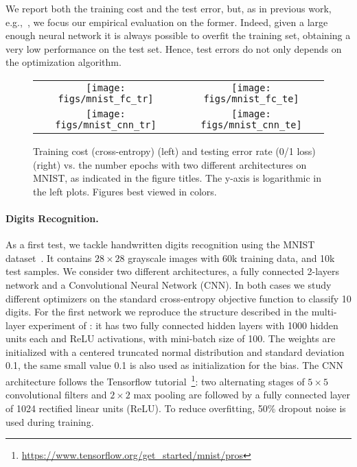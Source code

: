 \documentclass{article}
\begin{document}
We report both the training cost and the test error, but, as in previous work, e.g.,~\citep{KingmaB15}, 
we focus our empirical evaluation on the former. Indeed, given a large enough neural network it is always 
possible to overfit the training set, obtaining a very low performance on the test set. Hence, test errors 
do not only depends on the optimization algorithm.

\begin{figure}[t]
  \centering
  \begin{tabular}{c@{\hskip 1cm}c}
  \texttt{[image: figs/mnist\_fc\_tr]} &
  \texttt{[image: figs/mnist\_fc\_te]} \\
  \texttt{[image: figs/mnist\_cnn\_tr]} &
  \texttt{[image: figs/mnist\_cnn\_te]}
  \end{tabular} 
  \caption{Training cost (cross-entropy) (left) and testing error rate (0/1 loss) (right) vs. the number 
epochs with two different architectures on MNIST, as indicated in the figure titles. The y-axis is logarithmic 
in the left plots. Figures best viewed in colors.}
  \label{fig:exp1}
\end{figure}

\paragraph{Digits Recognition.}
As a first test, we tackle handwritten digits recognition using the MNIST dataset~\citep{MNIST}.
It contains $28\times 28$ grayscale images with 60k training data, and 10k test samples.   
We consider two different architectures, a fully connected 2-layers network and a 
Convolutional Neural Network (CNN). In both cases we study different optimizers on the standard
cross-entropy objective function to classify 10 digits. 
For the first network we reproduce the structure described in the multi-layer experiment of 
\citep{KingmaB15}: it has two fully connected
hidden layers with 1000 hidden units each and ReLU activations, with mini-batch size of 100.
The weights are initialized with a centered truncated normal distribution and standard deviation 0.1,
the same small value 0.1 is also used as initialization for the bias.
The CNN architecture follows the Tensorflow tutorial~\footnote{\url{https://www.tensorflow.org/get_started/mnist/pros}}:
two alternating stages of $5 \times 5$ convolutional filters and 
$2 \times 2$ max pooling are followed by a fully connected layer of 1024 
rectified linear units (ReLU). To reduce overfitting, 50\% dropout noise is used during training.
\end{document}
